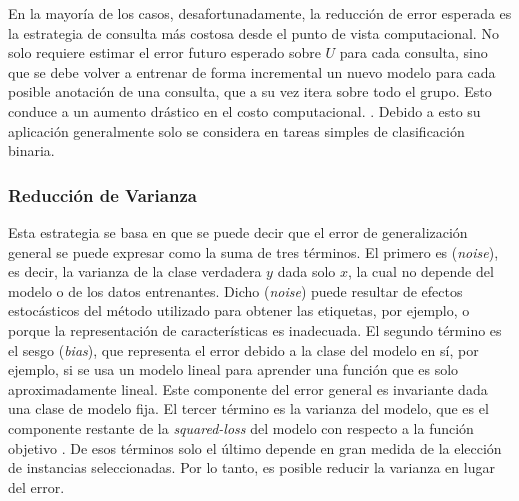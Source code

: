 En la mayoría de los casos, desafortunadamente, la reducción de error esperada es la estrategia de consulta más costosa desde el punto de vista computacional. No solo requiere estimar el error futuro esperado sobre $U$ para cada consulta, sino que se debe volver a entrenar de forma incremental un nuevo modelo para cada posible anotación de una consulta, que a su vez itera sobre todo el grupo. Esto conduce a un aumento drástico en el costo computacional. \cite{settles2009survey}. Debido a esto su aplicación generalmente solo se considera en tareas simples de clasificación binaria. 


\subsubsection{Reducción de Varianza}

Esta estrategia se basa en que se puede decir que el error de generalización general se puede expresar como la suma de tres términos. El primero es (\textit{noise}), es decir, la varianza de la clase verdadera $y$ dada solo $x$, la cual no depende del modelo o de los datos entrenantes. Dicho (\textit{noise}) puede resultar de efectos estocásticos del método utilizado para obtener las etiquetas, por ejemplo, o porque la representación de características es inadecuada. El segundo término es el sesgo (\textit{bias}), que representa el error debido a la clase del modelo en sí, por ejemplo, si se usa un modelo lineal para aprender una función que es solo aproximadamente lineal. Este componente del error general es invariante dada una clase de modelo fija. El tercer término es la varianza del modelo, que es el componente restante de la \textit{squared-loss} del modelo con respecto a la función objetivo \cite{geman1992neural}.  De esos términos solo el último depende en gran medida de la elección de instancias seleccionadas. Por lo tanto, es posible reducir la varianza en lugar del error.



